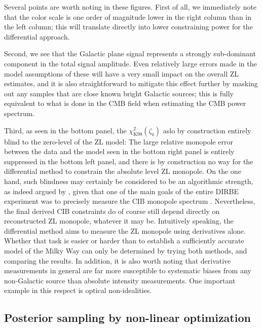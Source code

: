 \documentclass[twocolumn]{aa}
\begin{document}
Several points are worth noting in these figures. First of all, we
immediately note that the color scale is one order of magnitude lower
in the right column than in the left column; this will translate
directly into lower constraining power for the differential
approach.

Second, we see that the Galactic plane signal represents a strongly
sub-dominant component in the total signal amplitude. Even relatively
large errors made in the model assumptions of these will have a very
small impact on the overall ZL estimates, and it is also
straightforward to mitigate this effect further by masking out any
samples that are close known bright Galactic sources; this is fully
equivalent to what is done in the CMB field when estimating the CMB
power spectrum.

Third, as seen in the bottom panel, the $\chi^2_{\mathrm{K98}}
(\zeta_{\mathrm{z}})$ aslo by construction entirely blind to the
zero-level of the ZL model: The large relative monopole error between
the data and the model seen in the bottom right panel is entirely
suppressed in the bottom left panel, and there is by construction no
way for the differential method to constrain the absolute level ZL
monopole. On the one hand, such blindness may certainly be considered
to be an algorithmic strength, as indeed argued by
\citet{Kelsall1998}, given that one of the main goals of the entire
DIRBE experiment was to precisely measure the CIB monopole spectrum
\citep{hauser1998}. Nevertheless, the final derived CIB constraints do
of course still depend directly on reconstructed ZL monopole, whatever
it may be. Intuitively speaking, the differential method aims to
measure the ZL monopole using derivatives alone. Whether that task is
easier or harder than to establish a sufficiently accurate model of
the Milky Way can only be determined by trying both methods, and
comparing the results. In addition, it is also worth noting that
derivative measurements in general are far more susceptible to
systematic biases from any non-Galactic source than absolute intensity
measurements. One important example in this respect is optical
non-idealities.

\subsection{Posterior sampling by non-linear optimization}
\label{sec:nonlin}
\end{document}
